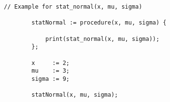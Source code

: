 	\begin{center}
		\begin{lstlisting}[caption=Test File Example, language=setlx, label=lis:exampleCode]
		// Example for stat_normal(x, mu, sigma)

		statNormal := procedure(x, mu, sigma) {

			print(stat_normal(x, mu, sigma));
		};

		x     := 2;
		mu	  := 3;
		sigma := 9;

		statNormal(x, mu, sigma);
		\end{lstlisting}
	\end{center}

